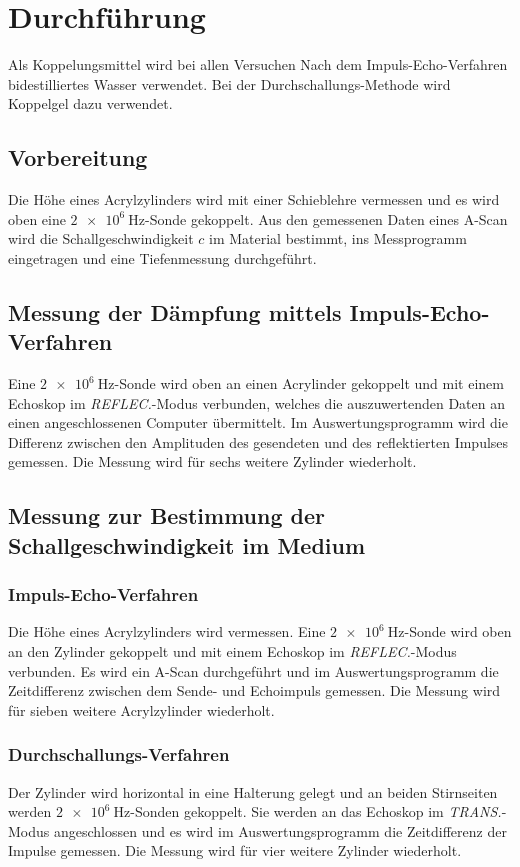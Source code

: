 \section{Durchführung}
\label{sec:Durchführung}

Als Koppelungsmittel wird bei allen Versuchen Nach dem Impuls-Echo-Verfahren bidestilliertes Wasser verwendet. Bei der Durchschallungs-Methode wird Koppelgel dazu  verwendet.

\subsection{Vorbereitung}
Die Höhe eines Acrylzylinders wird mit einer Schieblehre vermessen und es wird oben eine $\SI{2e6}{\hertz}$-Sonde gekoppelt.
Aus den gemessenen Daten eines A-Scan wird die Schallgeschwindigkeit $c$ im Material bestimmt, ins Messprogramm eingetragen und eine Tiefenmessung durchgeführt.

\subsection{Messung der Dämpfung mittels Impuls-Echo-Verfahren}
Eine $\SI{2e6}{\hertz}$-Sonde wird oben an einen Acrylinder gekoppelt und mit einem Echoskop im \textit{REFLEC.}-Modus verbunden, welches die auszuwertenden Daten an einen angeschlossenen Computer übermittelt.
Im Auswertungsprogramm wird die Differenz zwischen den Amplituden des gesendeten und des reflektierten Impulses gemessen. 
Die Messung wird für sechs weitere Zylinder wiederholt.

\subsection{Messung zur Bestimmung der Schallgeschwindigkeit im Medium}
\subsubsection{Impuls-Echo-Verfahren}
Die Höhe eines Acrylzylinders wird vermessen. Eine $\SI{2e6}{\hertz}$-Sonde wird oben an den Zylinder gekoppelt und mit einem Echoskop im \textit{REFLEC.}-Modus verbunden.
Es wird ein A-Scan durchgeführt und im Auswertungsprogramm die Zeitdifferenz zwischen dem Sende- und Echoimpuls gemessen.
Die Messung wird für sieben weitere Acrylzylinder wiederholt.

\subsubsection{Durchschallungs-Verfahren}
Der Zylinder wird horizontal in eine Halterung gelegt und an beiden Stirnseiten werden $\SI{2e6}{\hertz}$-Sonden gekoppelt. Sie werden an das Echoskop im \textit{TRANS.}-Modus angeschlossen und es wird im Auswertungsprogramm die Zeitdifferenz der Impulse gemessen.
Die Messung wird für vier weitere Zylinder wiederholt.

